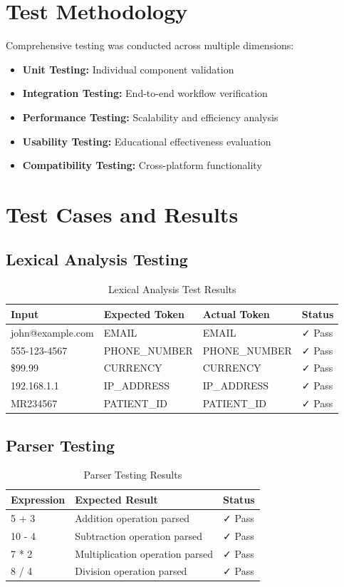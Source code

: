 \documentclass[a4paper,12pt]{report}
\begin{document}
\section{Test Methodology}
Comprehensive testing was conducted across multiple dimensions:
\begin{itemize}
    \item \textbf{Unit Testing:} Individual component validation
    \item \textbf{Integration Testing:} End-to-end workflow verification
    \item \textbf{Performance Testing:} Scalability and efficiency analysis
    \item \textbf{Usability Testing:} Educational effectiveness evaluation
    \item \textbf{Compatibility Testing:} Cross-platform functionality
\end{itemize}

\section{Test Cases and Results}

\subsection{Lexical Analysis Testing}
\begin{table}[H]
\centering
\begin{tabular}{|l|l|l|l|}
\hline
\textbf{Input} & \textbf{Expected Token} & \textbf{Actual Token} & \textbf{Status} \\
\hline
john@example.com & EMAIL & EMAIL & ✓ Pass \\
555-123-4567 & PHONE\_NUMBER & PHONE\_NUMBER & ✓ Pass \\
\$99.99 & CURRENCY & CURRENCY & ✓ Pass \\
192.168.1.1 & IP\_ADDRESS & IP\_ADDRESS & ✓ Pass \\
MR234567 & PATIENT\_ID & PATIENT\_ID & ✓ Pass \\
\hline
\end{tabular}
\caption{Lexical Analysis Test Results}
\label{tab:lex_tests}
\end{table}

\subsection{Parser Testing}
\begin{table}[H]
\centering
\begin{tabular}{|l|l|l|}
\hline
\textbf{Expression} & \textbf{Expected Result} & \textbf{Status} \\
\hline
5 + 3 & Addition operation parsed & ✓ Pass \\
10 - 4 & Subtraction operation parsed & ✓ Pass \\
7 * 2 & Multiplication operation parsed & ✓ Pass \\
8 / 4 & Division operation parsed & ✓ Pass \\
\hline
\end{tabular}
\caption{Parser Testing Results}
\label{tab:parser_tests}
\end{table}
\end{document}
